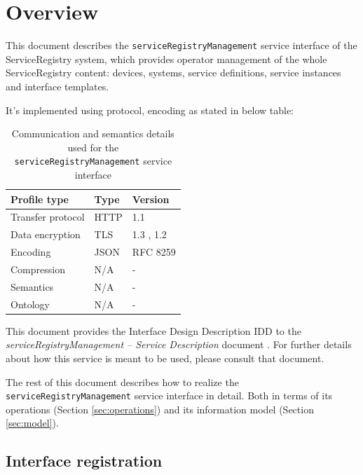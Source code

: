 \documentclass[a4paper]{arrowhead}
\begin{document}
\section{Overview}
\label{sec:overview}

This document describes the \texttt{service\allowbreak{}Registry\allowbreak{}Management} service interface of the ServiceRegistry system, which provides operator management of the whole ServiceRegistry content: devices, systems, service definitions, service instances and interface templates.

It's implemented using protocol, encoding as stated in below table:
\begin{table}[ht!]
  \centering
  \begin{tabular}{|l|l|l|}
    \hline
    \rowcolor{gray!33} Profile type & Type & Version \\ \hline
    Transfer protocol & HTTP & 1.1 \cite{rfc9112} \\ \hline
    Data encryption & TLS & 1.3 \cite{rfc8446}, 1.2 \cite{rfc5246} \\ \hline
    Encoding & JSON & RFC 8259 \cite{rfc8259} \\ \hline
    Compression & N/A & - \\ \hline
    Semantics & N/A & - \\ \hline
    Ontology & N/A & - \\ \hline
  \end{tabular}
  \caption{Communication and semantics details used for the \texttt{service\allowbreak{}Registry\allowbreak{}Management} service interface}
  \label{tab:comunication_semantics_profile}
\end{table}

This document provides the Interface Design Description IDD to the \textit{serviceRegistryManagement -- Service Description} document \cite{sr-serviceRegistryManagement-sd}.
For further details about how this service is meant to be used, please consult that document.

The rest of this document describes how to realize the \texttt{service\allowbreak{}Registry\allowbreak{}Management} service
interface in detail. Both in terms of its operations (Section \ref{sec:operations}) and its information model (Section \ref{sec:model}).

\subsection{Interface registration}
\end{document}
